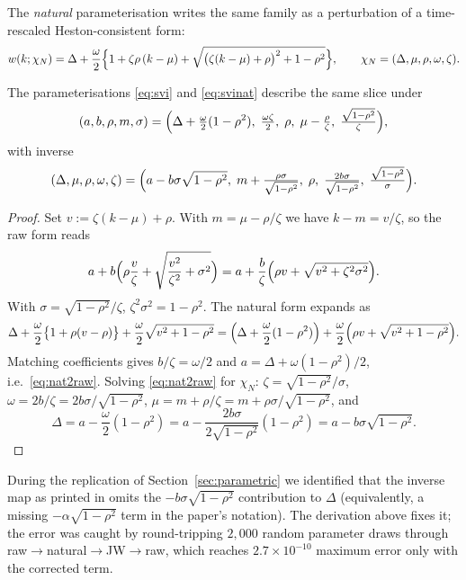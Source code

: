 The \emph{natural} parameterisation writes the same family as a perturbation of a
time-rescaled Heston-consistent form:
\begin{equation}\label{eq:svinat}
w(k;\chi_N)=\Delta+\frac{\omega}{2}
\Bigl\{1+\zeta\rho\,(k-\mu)+\sqrt{\bigl(\zeta(k-\mu)+\rho\bigr)^2+1-\rho^2}\Bigr\},
\qquad \chi_N=(\Delta,\mu,\rho,\omega,\zeta).
\end{equation}

\begin{lemma}
\label{lem:rawnat}
The parameterisations \eqref{eq:svi} and \eqref{eq:svinat} describe the same slice under
\begin{equation}\label{eq:nat2raw}
(a,b,\rho,m,\sigma)
=\Bigl(\Delta+\tfrac{\omega}{2}(1-\rho^2),\;\tfrac{\omega\zeta}{2},\;\rho,\;
\mu-\tfrac{\rho}{\zeta},\;\tfrac{\sqrt{1-\rho^2}}{\zeta}\Bigr),
\end{equation}
with inverse
\begin{equation}\label{eq:raw2nat}
(\Delta,\mu,\rho,\omega,\zeta)
=\Bigl(a- b\sigma\sqrt{1-\rho^2} ,\;
m+\tfrac{\rho\sigma}{\sqrt{1-\rho^2}},\;\rho,\;
\tfrac{2b\sigma}{\sqrt{1-\rho^2}},\;\tfrac{\sqrt{1-\rho^2}}{\sigma}\Bigr).
\end{equation}
\end{lemma}

\begin{proof}
Set $v:=\zeta(k-\mu)+\rho$. With $m=\mu-\rho/\zeta$ we have $k-m=v/\zeta$, so the raw form
reads
\[
a+b\Bigl(\rho\frac{v}{\zeta}+\sqrt{\frac{v^2}{\zeta^2}+\sigma^2}\Bigr)
=a+\frac{b}{\zeta}\Bigl(\rho v+\sqrt{v^2+\zeta^2\sigma^2}\Bigr).
\]
With $\sigma=\sqrt{1-\rho^2}/\zeta$, $\zeta^2\sigma^2=1-\rho^2$. The natural form expands as
\[
\Delta+\frac{\omega}{2}\bigl\{1+\rho(v-\rho)\bigr\}+\frac{\omega}{2}\sqrt{v^2+1-\rho^2}
=\Bigl(\Delta+\frac{\omega}{2}(1-\rho^2)\Bigr)
+\frac{\omega}{2}\Bigl(\rho v+\sqrt{v^2+1-\rho^2}\Bigr).
\]
Matching coefficients gives $b/\zeta=\omega/2$ and $a=\Delta+\omega(1-\rho^2)/2$, i.e.\
\eqref{eq:nat2raw}. Solving \eqref{eq:nat2raw} for $\chi_N$: $\zeta=\sqrt{1-\rho^2}/\sigma$,
$\omega=2b/\zeta=2b\sigma/\sqrt{1-\rho^2}$, $\mu=m+\rho/\zeta=m+\rho\sigma/\sqrt{1-\rho^2}$,
and
\[
\Delta=a-\frac{\omega}{2}(1-\rho^2)=a-\frac{2b\sigma}{2\sqrt{1-\rho^2}}(1-\rho^2)
=a-b\sigma\sqrt{1-\rho^2}.
\]
\end{proof}

\begin{remark}\label{rem:gjtypo}
During the replication of Section~\ref{sec:parametric} we identified that the inverse map as
printed in \cite[Lemma~3.2]{gatheraljacquier2014} omits the $-b\sigma\sqrt{1-\rho^2}$
contribution to $\Delta$ (equivalently, a missing $-\alpha\sqrt{1-\rho^2}$ term in the paper's
notation). The derivation above fixes it; the error was caught by round-tripping $2{,}000$
random parameter draws through raw$\to$natural$\to$JW$\to$raw, which reaches $2.7\times10^{-10}$
maximum error only with the corrected term.
\end{remark}

